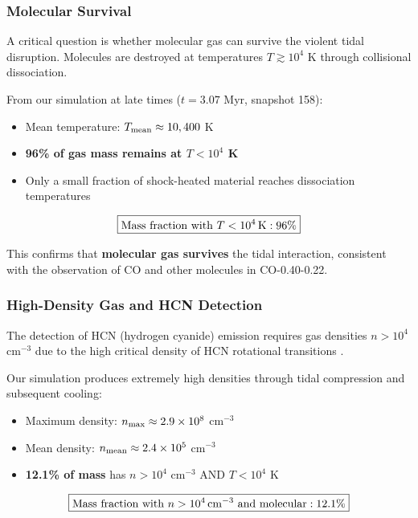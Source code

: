 \documentclass[twocolumn,amsmath,amssymb,prd,superscriptaddress,nofootinbib]{revtex4-2}
\begin{document}
\subsubsection{Molecular Survival}
\label{sec:molecular_survival}

A critical question is whether molecular gas can survive the violent tidal disruption. Molecules are destroyed at temperatures $T \gtrsim 10^4$ K through collisional dissociation.

From our simulation at late times ($t = 3.07$ Myr, snapshot 158):
\begin{itemize}
    \item Mean temperature: $T_{\rm mean} \approx 10,400$ K
    \item \textbf{96\% of gas mass remains at $T < 10^4$ K}
    \item Only a small fraction of shock-heated material reaches dissociation temperatures
\end{itemize}

\begin{equation}
    \boxed{\text{Mass fraction with } T < 10^4\,{\rm K}: 96\%}
\end{equation}

This confirms that \textbf{molecular gas survives} the tidal interaction, consistent with the observation of CO and other molecules in CO-0.40-0.22.

\subsubsection{High-Density Gas and HCN Detection}
\label{sec:hcn}

The detection of HCN (hydrogen cyanide) emission requires gas densities $n > 10^4$ cm$^{-3}$ due to the high critical density of HCN rotational transitions \cite{Shirley2015}.

Our simulation produces extremely high densities through tidal compression and subsequent cooling:
\begin{itemize}
    \item Maximum density: $n_{\rm max} \approx 2.9 \times 10^8$ cm$^{-3}$
    \item Mean density: $n_{\rm mean} \approx 2.4 \times 10^5$ cm$^{-3}$
    \item \textbf{12.1\% of mass} has $n > 10^4$ cm$^{-3}$ AND $T < 10^4$ K
\end{itemize}

\begin{equation}
    \boxed{\text{Mass fraction with } n > 10^4\,{\rm cm}^{-3} \text{ and molecular}: 12.1\%}
\end{equation}
\end{document}
